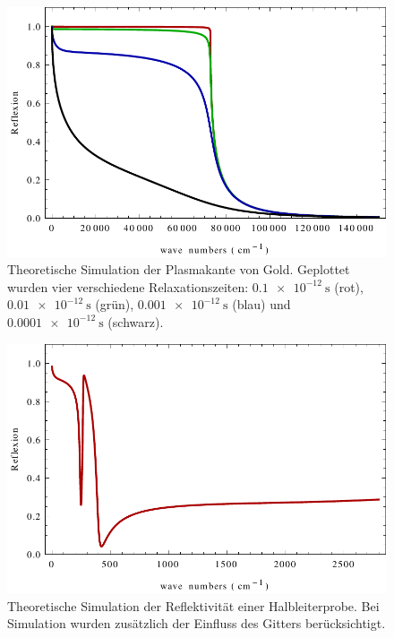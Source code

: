 \documentclass[paper=a4,fontsize=10pt,DIV=18,twocolumn,parskip=half]{scrartcl}
\numberwithin{equation}{section}    %
\begin{document}
\begin{figure}
	\begin{center}
		\includegraphics[width=\columnwidth]{Bilder/reflexion_metall}
		\caption{Theoretische Simulation der Plasmakante von Gold. Geplottet wurden vier verschiedene Relaxationszeiten: $\SI{0.1e-12}{\second}$ (rot), $\SI{0.01e-12}{\second}$ (grün), $\SI{0.001e-12}{\second}$ (blau) und $\SI{0.0001e-12}{\second}$ (schwarz).}
		\label{reflexion_metall}
	\end{center}
\end{figure}

\begin{figure}
	\begin{center}
		\includegraphics[width=\columnwidth]{Bilder/reflexion_hl}
		\caption{Theoretische Simulation der Reflektivität einer Halbleiterprobe. Bei Simulation wurden zusätzlich der Einfluss des Gitters berücksichtigt.}
		\label{reflexion_hl}
	\end{center}
\end{figure}
\end{document}

